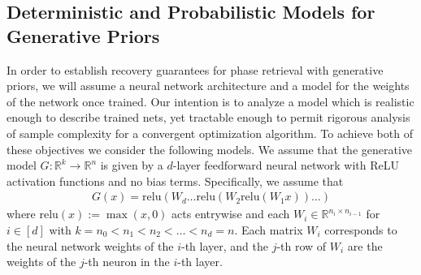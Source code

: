 \documentclass[11pt]{article}
\newcommand{\R}{\mathbb{R}}
\newcommand{\relu}{\text{relu}}
\newcommand{\G}{G}
\theoremstyle{remark}
\begin{document}


  
  
\subsection{Deterministic and Probabilistic Models for Generative Priors}

In order to establish recovery guarantees for phase retrieval with generative priors, we will assume a neural network architecture and a model for the weights of the network once trained.  Our intention is to analyze a model which is realistic enough to describe trained nets, yet tractable enough to permit rigorous analysis of sample complexity for a convergent optimization algorithm.  To achieve both of these objectives we consider the following models.  We assume that the generative model $\G : \R^k \rightarrow \R^n$ is given by a $d$-layer feedforward neural network with ReLU activation functions and no bias terms. Specifically, we assume that \begin{align}
\G(x) = \relu(W_d\dots\relu(W_2\relu(W_1x))\dots) \label{Generator_formula}
\end{align}
where $\relu(x) := \max(x,0)$ acts entrywise and each $W_i \in \R^{n_i \times n_{i-1}}$ for $i \in [d]$ with $k = n_0 < n_1 < n_2 < \dots < n_d = n.$  Each matrix $W_i$ corresponds to the neural network weights of the $i$-th layer, and the $j$-th row of $W_i$ are the weights of the $j$-th neuron in the $i$-th layer.
\end{document}
